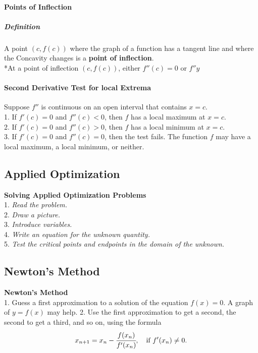 \documentclass{article}
\begin{document}
            \paragraph{Points of Inflection}
                \subparagraph{Definition} A point $(c,f(c))$ where the graph of a function has a tangent line and where the Concavity changes is a \textbf{point of inflection}.
            \newline\\
            *At a point of inflection $(c,f(c))$, either $f''(c)=0$ or $f''y$\\
            \paragraph{Second Derivative Test for local Extrema}
            Suppose $f''$ is continuous on an open interval that contains $x=c$.\\
            1. If $f'(c)=0$ and $f''(c)<0$, then $f$ has a local maximum at $x=c$.\\
            2. If $f'(c)=0$ and $f''(c)>0$, then $f$ has a local minimum at $x=c$.\\
            3. If $f'(c)=0$ and $f''(c)=0$, then the test fails. The function $f$ may have a local maximum, a local minimum, or neither.\\

        \subsection{Applied Optimization}
            \textbf{Solving Applied Optimization Problems}\\
            1. \textit{Read the problem.}\\
            2. \textit{Draw a picture.}\\
            3. \textit{Introduce variables.}\\
            4. \textit{Write an equation for the unknown quantity.}\\
            5. \textit{Test the critical points and endpoints in the domain of the unknown.}\\
        
        \subsection{Newton's Method}
            \textbf{Newton's Method}\\
            1. Guess a first approximation to a solution of the equation $f(x)=0$. A graph of $y=f(x)$ may help.
            2. Use the first approximation to get a second, the second to get a third, and so on, using the formula
            \[x_{n+1}=x_n -\cfrac{f(x_n)}{f'(x_n)},\quad \text{if $f'(x_n)\ne 0$}.\]
\end{document}
